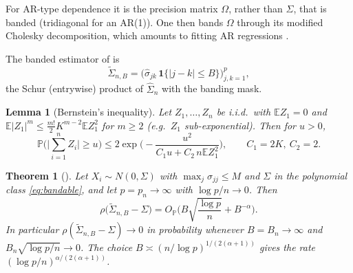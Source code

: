 \documentclass[11pt]{article}
\newtheorem{lemma}{Lemma}
\newtheorem{thm}{Theorem}
\newcommand{\wh}{\widehat}
\newcommand{\wt}{\widetilde}
\newcommand{\Prob}{\mathbb{P}}
\newcommand{\Expect}{\mathbb{E}}
\begin{document}
For AR-type dependence it is the precision matrix $\Omega$, rather than $\Sigma$, that is banded (tridiagonal for an AR(1)). One then bands $\Omega$ through its modified Cholesky decomposition, which amounts to fitting AR regressions \citep{WP03,BL08a}.


\medskip
The banded estimator of \citet{BL08a} is
\[
\wt\Sigma_{n,B}=\big(\wh\sigma_{jk}\,\mathbf 1\{|j-k|\le B\}\big)_{j,k=1}^p,
\]
the Schur (entrywise) product of $\wh\Sigma_n$ with the banding mask.

\begin{lemma}[Bernstein's inequality]\label{lmm:bernstein}
Let $Z_1,\dots,Z_n$ be i.i.d.\ with $\Expect Z_1=0$ and $\Expect|Z_1|^m\le\frac{m!}2K^{m-2}\Expect Z_1^2$ for $m\ge2$ (e.g.\ $Z_1$ sub-exponential). Then for $u>0$,
\[
\Prob\Big(\Big|\sum_{i=1}^nZ_i\Big|\ge u\Big)\le2\exp\Big(-\frac{u^2}{C_1u+C_2\,n\Expect Z_1^2}\Big),\qquad C_1=2K,\ C_2=2 .
\]
\end{lemma}

\begin{thm}[\citet{BL08a}]\label{thm:band}
Let $X_i\sim N(0,\Sigma)$ with $\max_j\sigma_{jj}\le M$ and $\Sigma$ in the polynomial class \eqref{eq:bandable}, and let $p=p_n\to\infty$ with $\log p/n\to0$. Then
\[
\rho\big(\wt\Sigma_{n,B}-\Sigma\big)=O_\Prob\Big(B\sqrt{\frac{\log p}n}+B^{-\alpha}\Big).
\]
In particular $\rho(\wt\Sigma_{n,B}-\Sigma)\to0$ in probability whenever $B=B_n\to\infty$ and $B_n\sqrt{\log p/n}\to0$. The choice $B\asymp(n/\log p)^{1/(2(\alpha+1))}$ gives the rate $(\log p/n)^{\alpha/(2(\alpha+1))}$.
\end{thm}
\end{document}
